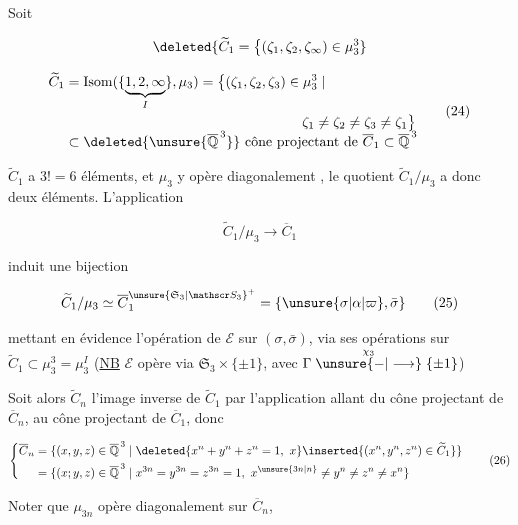 

Soit

\[
\deleted{\widetilde C_1=\bigl\{(\zeta_1,\zeta_2,\zeta_\infty)\in\mu_3^3}
\]

\[
\begin{aligned}
\widetilde C_1&=\operatorname{Isom}(\{\underbrace{1,2,\infty}_{I}\},\mu_3)
=\bigl\{(\zeta_1,\zeta_2,\zeta_3)\in\mu_3^3\mid\\
&\hspace{17em}\zeta_1\ne\zeta_2\ne\zeta_3\ne\zeta_1\bigr\}\\[-1ex]
&\subset\deleted{\unsure{\overline{\mathbb Q}^{\,3}}}\ \text{cône projectant de }\overline C_1\subset\overline{\mathbb Q}^{\,3}
\end{aligned}\tag*{(24)}
\]

$\widetilde C_1$ a $3!=6$ éléments, et $\mu_3$ y opère diagonalement  , le quotient $\widetilde C_1/\mu_3$ a donc deux éléments. L'application

\[
\widetilde C_1/\mu_3\longrightarrow\overline C_1
\]


induit une bijection

\[
\widetilde C_1/\mu_3\simeq\overline C_1^{\unsure{\mathfrak S_3|\mathscr S_3}^{+}}
=\{\unsure{\sigma|\alpha|\varpi},\bar\sigma\}
\tag*{(25)}
\]

mettant en évidence l'opération de $\mathcal E$ sur $(\sigma,\bar\sigma)$, via ses opérations sur $\widetilde C_1\subset\mu_3^3=\mu_3^I$ (\uline{NB} $\mathcal E$ opère via $\mathfrak S_3\times\{\pm1\}$, avec $\Gamma\mathrel{\overset{\chi_3}{\unsure{-|\longrightarrow}}}\{\pm1\}$)

Soit alors $\widetilde C_n$ l'image inverse de $\widetilde C_1$ par l'application allant du cône projectant de $\overline C_n$, au cône projectant de $\overline C_1$, donc 

\[
\left\{\begin{aligned}
\overline C_n&=\{(x,y,z)\in\overline{\mathbb Q}^{\,3}\mid
\deleted{x^n+y^n+z^n=1,\ x}\inserted{(x^n,y^n,z^n)\in\widetilde C_1}\}\\
&=\{(x;y,z)\in\overline{\mathbb Q}^{\,3}\mid
x^{3n}=y^{3n}=z^{3n}=1,\ x^{\unsure{3n|n}}\ne y^n\ne z^n\ne x^n\}
\end{aligned}\right.\tag*{(26)}
\]

Noter que $\mu_{3n}$ opère diagonalement sur $\overline C_n$,

